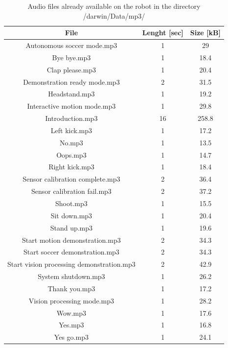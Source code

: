 \documentclass[a4paper, 12pt]{article}  		%
\begin{document}
\begin{table}[H]
\begin{center}
\begin{tabular}{ | c | c | c |  }

\hline
File & Lenght [sec] & Size [kB] \\ 
\hline
\hline
Autonomous soccer mode.mp3 & 1 & 29 \\
\hline
Bye bye.mp3 & 1 & 18.4 \\
\hline
Clap please.mp3 & 1 & 20.4 \\
\hline
Demonstration ready mode.mp3 & 2 & 31.5 \\
\hline
Headstand.mp3 & 1 & 19.2 \\
\hline
Interactive motion mode.mp3 & 1 & 29.8 \\
\hline
Introduction.mp3 & 16 & 258.8 \\
\hline
Left kick.mp3 & 1 & 17.2 \\
\hline
No.mp3 & 1 & 13.5 \\
\hline
Oops.mp3 & 1 & 14.7 \\
\hline
Right kick.mp3 & 1 & 18.4 \\
\hline
Sensor calibration complete.mp3 & 2 & 36.4 \\
\hline
Sensor calibration fail.mp3 & 2 & 37.2 \\
\hline
Shoot.mp3 & 1 & 15.5 \\
\hline
Sit down.mp3 & 1 & 20.4 \\
\hline
Stand up.mp3 & 1 & 19.6 \\
\hline
Start motion demonstration.mp3 & 2 & 34.3 \\
\hline
Start soccer demonstration.mp3 & 2 & 34.3 \\
\hline
Start vision processing demonstration.mp3 & 2 & 42.9 \\
\hline
System shutdown.mp3 & 1 & 26.2 \\
\hline
Thank you.mp3 & 1 & 17.2 \\
\hline
Vision processing mode.mp3 & 1 & 28.2 \\
\hline
Wow.mp3 & 1 & 17.6 \\
\hline
Yes.mp3 & 1 & 16.8 \\
\hline
Yes go.mp3 & 1 & 24.1 \\
\hline
\end{tabular}
\caption{Audio files already available on the robot in the directory /darwin/Data/mp3/}
\label{tab::audioFile}
\end{center}
\end{table}
\end{document}
